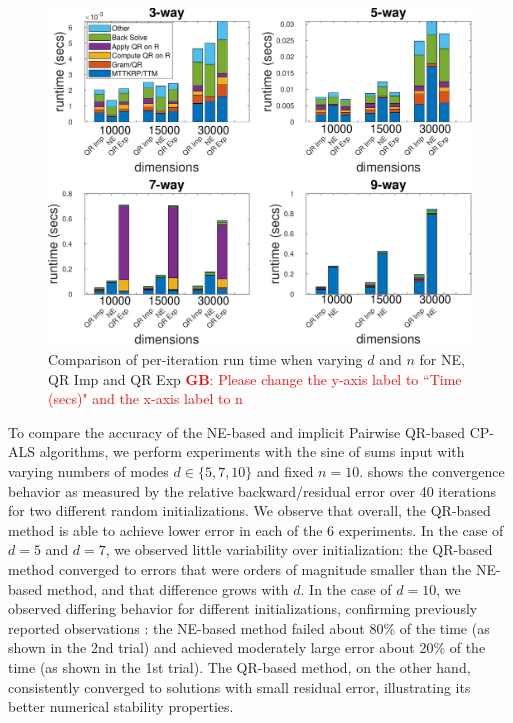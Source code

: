 \documentclass{article}
\newcommand{\GB}[1]{\textcolor{red}{\textbf{GB}: #1}}
\begin{document}
\begin{figure}[ht!]
  \begin{center}
    \includegraphics[scale = 0.7]{Fig_kt.pdf}
    \caption[Figure]{Comparison of per-iteration run time when varying $d$ and $n$ for NE, QR Imp and QR Exp \GB{Please change the y-axis label to ``Time (secs)" and the x-axis label to n} \label{fig:runtime}}
  \end{center}
\end{figure}


To compare the accuracy of the NE-based and implicit Pairwise QR-based CP-ALS algorithms, we perform experiments with the sine of sums input with varying numbers of modes $d\in \{5,7,10\}$ and fixed $n=10$.
 shows the convergence behavior as measured by the relative backward/residual error over 40 iterations for two different random initializations.
We observe that overall, the QR-based method is able to achieve lower error in each of the 6 experiments.
In the case of $d=5$ and $d=7$, we observed little variability over initialization: the QR-based method converged to errors that were orders of magnitude smaller than the NE-based method, and that difference grows with $d$.
In the case of $d=10$, we observed differing behavior for different initializations, confirming previously reported observations \cite{MVLB23}: the NE-based method failed about 80\% of the time (as shown in the 2nd trial) and achieved moderately large error about 20\% of the time (as shown in the 1st trial).
The QR-based method, on the other hand, consistently converged to solutions with small residual error, illustrating its better numerical stability properties.
\end{document}
